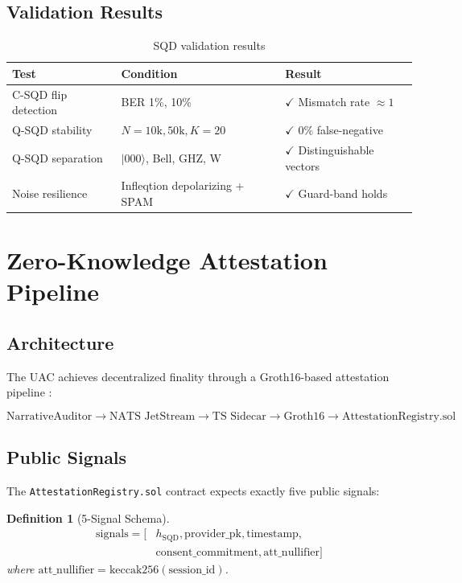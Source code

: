 \documentclass[11pt,a4paper]{article}
\newtheorem{definition}{Definition}
\theoremstyle{plain}
\begin{document}
\subsection{Validation Results}

\begin{table}[h]
\centering
\begin{tabular}{lll}
\toprule
\textbf{Test} & \textbf{Condition} & \textbf{Result} \\
\midrule
C-SQD flip detection & BER 1\%, 10\% & $\checkmark$ Mismatch rate $\approx 1$ \\
Q-SQD stability & $N = 10\text{k}, 50\text{k}, K = 20$ & $\checkmark$ 0\% false-negative \\
Q-SQD separation & $|000\rangle$, Bell, GHZ, W & $\checkmark$ Distinguishable vectors \\
Noise resilience & Infleqtion depolarizing + SPAM & $\checkmark$ Guard-band holds \\
\bottomrule
\end{tabular}
\caption{SQD validation results}
\label{tab:sqdValidation}
\end{table}

\section{Zero-Knowledge Attestation Pipeline}

\subsection{Architecture}

The UAC achieves decentralized finality through a Groth16-based attestation pipeline \cite{groth16, groth16GPU}:

\begin{equation}
    \text{NarrativeAuditor} \rightarrow \text{NATS JetStream} \rightarrow \text{TS Sidecar} \rightarrow \text{Groth16} \rightarrow \text{AttestationRegistry.sol}
\end{equation}

\subsection{Public Signals}

The \texttt{AttestationRegistry.sol} contract expects exactly five public signals:

\begin{definition}[5-Signal Schema]
\begin{align}
    \text{signals} = [&h_{\text{SQD}}, \text{provider\_pk}, \text{timestamp}, \\
    &\text{consent\_commitment}, \text{att\_nullifier}]
\end{align}
where $\text{att\_nullifier} = \text{keccak256}(\text{session\_id})$.
\end{definition}
\end{document}
